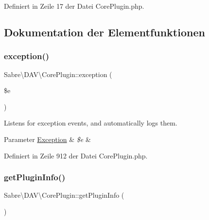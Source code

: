 Definiert in Zeile 17 der Datei Core\+Plugin.\+php.



\subsection{Dokumentation der Elementfunktionen}
\mbox{\label{class_sabre_1_1_d_a_v_1_1_core_plugin_aaf2b1b6a32575b437519d0214d301e1f}} 
\subsubsection{\texorpdfstring{exception()}{exception()}}
{\footnotesize\ttfamily Sabre\textbackslash{}\+D\+A\+V\textbackslash{}\+Core\+Plugin\+::exception (\begin{DoxyParamCaption}\item[{}]{\$e }\end{DoxyParamCaption})}

Listens for exception events, and automatically logs them.


\begin{DoxyParams}[1]{Parameter}
\mbox{\hyperlink{class_sabre_1_1_d_a_v_1_1_exception}{Exception}} & {\em \$e} & \\
\hline
\end{DoxyParams}


Definiert in Zeile 912 der Datei Core\+Plugin.\+php.

\mbox{\label{class_sabre_1_1_d_a_v_1_1_core_plugin_a2161a6cfdfed86d4dd711a959131722d}} 
\subsubsection{\texorpdfstring{get\+Plugin\+Info()}{getPluginInfo()}}
{\footnotesize\ttfamily Sabre\textbackslash{}\+D\+A\+V\textbackslash{}\+Core\+Plugin\+::get\+Plugin\+Info (\begin{DoxyParamCaption}{ }\end{DoxyParamCaption})}

